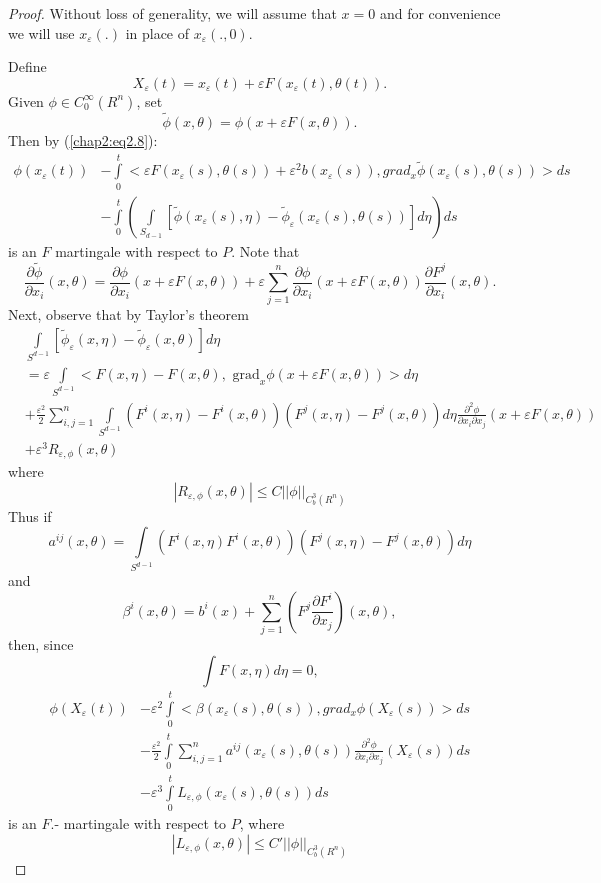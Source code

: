 \begin{proof}
Without loss of generality, we will assume that $x = 0$ and for
convenience we will use $x_\varepsilon (.)$ in place of $x_\varepsilon
(.,0)$. 

Define
$$
X_\varepsilon (t) = x_\varepsilon (t) + \varepsilon
F(x_\varepsilon(t), \theta(t)). 
$$
Given $\phi \in C^\infty_0 (R^n)$, set
$$
\tilde{\phi}(x, \theta) = \phi(x + \varepsilon F(x, \theta)).
$$
Then by (\ref{chap2:eq2.8}):
\begin{align*}
\phi(x_\varepsilon (t)) & - \int \limits^t_0 < \varepsilon F
(x_\varepsilon (s), \theta(s)) + \varepsilon^2 b(x_\varepsilon (s)) ,
grad_x \tilde{\phi}(x_\varepsilon (s), \theta(s)) > ds \\ 
& -\int\limits^t_0 ( \int \limits_{S_{d-1}} [
  \tilde{\phi}(x_\varepsilon (s), \eta) - \tilde{\phi}_{\varepsilon}(x_\varepsilon
  (s), \theta(s)) ] d \eta ) ds 
\end{align*}
is an $F$ martingale with respect to $P$. Note that
$$
\frac{\partial \tilde{\phi}}{\partial x_i} (x, \theta) =
\frac{\partial \phi}{\partial x_i} (x + \varepsilon F (x, \theta)) +
\varepsilon \sum^n_{j=1} \frac{\partial \phi}{\partial x_i} (x +
\varepsilon F (x, \theta)) \frac{\partial F^j}{\partial x_i} (x,
\theta). 
$$
Next, observe that by Taylor's theorem
{\fontsize{10pt}{12pt}\selectfont
\begin{align*}
& \int \limits_{S^{d-1}} [\tilde{\phi}_{\varepsilon}(x, \eta) -
    \tilde{\phi}_{\varepsilon}(x, \theta)]d \eta\\ 
& = \varepsilon \int\limits_{S^{d-1}} < F(x, \eta)- F(x, \theta),
  \text{ grad}_x \phi(x +
  \varepsilon F(x, \theta)) > d \eta \\ 
& + \frac{\varepsilon^2}{2} \sum^n_{i, j = 1} \int\limits_{S^{d-1}}
  (F^i (x, \eta) - F^i (x,  \theta)) (F^j(x, \eta) - F^j(x, \theta)) d
  \eta \frac{\partial^2  \phi}{\partial x_i \partial x_j} (x +
  \varepsilon F (x, \theta)) 
  \\ 
& + \varepsilon^3 R_{\varepsilon , \phi}(x, \theta)  
\end{align*}}\relax
where\pageoriginale
$$
|R_{\varepsilon , \phi}(x, \theta)| \le C|| \phi ||_{C^3_b(R^n)} 
$$
Thus if 
$$
a^{ij}(x, \theta) = \int\limits_{S^{d-1}} (F^i(x, \eta) F^i(x, 
\theta)) (F^j(x, \eta) - F^j (x, \theta)) d \eta  
$$
and 
$$
\beta^i (x, \theta) = b^i(x) + \sum^n_{j=1} (F^j \frac{\partial 
  F^i}{\partial x_j}) (x, \theta), 
$$
then, since  
$$
\int F(x, \eta) d \eta = 0,  
$$
\begin{align*}
\phi(X_\varepsilon(t)) &- \varepsilon^2 \int \limits^t_0 <
\beta(x_\varepsilon(s), \theta(s)), grad_x \phi(X_\varepsilon(s))  >
ds \\
& - \frac{\varepsilon^2}{2} \int \limits^t_0 \sum^n_{i, j = 1}
a^{ij}(x_\varepsilon(s), \theta(s)) \frac{\partial^2 \phi}{\partial
  x_i \partial x_j} (X_\varepsilon(s)) ds \\ 
& -\varepsilon^3 \int \limits^t_0 L_{\varepsilon ,
  \phi}(x_\varepsilon(s), \theta(s))ds 
\end{align*}\pageoriginale
is an $F.$- martingale with respect to $P$, where
$$
|L_{\varepsilon , \phi}(x, \theta)| \le C' || \phi || _{C^3_b(R^n)} 
$$


\end{proof}
